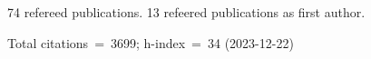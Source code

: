 74 refereed publications. 13 refeered publications as first author.

Total citations~=~3699; h-index~=~34 (2023-12-22)